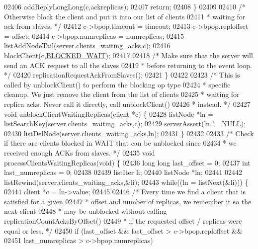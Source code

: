 \begin{DoxyCode}
{{{{{{{{{{{{{{{{{{{{{{{{{{{{{{{{{{{{{{{{{{{{{{{{{{{{{{{{{{{{{{{{{{{{{{{{{{{02406         addReplyLongLong(c,ackreplicas);
02407         \textcolor{keywordflow}{return};
02408     \}
02409 
02410     \textcolor{comment}{/* Otherwise block the client and put it into our list of clients}
02411 \textcolor{comment}{     * waiting for ack from slaves. */}
02412     c->bpop.timeout = timeout;
02413     c->bpop.reploffset = offset;
02414     c->bpop.numreplicas = numreplicas;
02415     listAddNodeTail(server.clients\_waiting\_acks,c);
02416     blockClient(c,\hyperlink{server_8h_accb912da92773eadb0b938af3fa95c63}{BLOCKED\_WAIT});
02417 
02418     \textcolor{comment}{/* Make sure that the server will send an ACK request to all the slaves}
02419 \textcolor{comment}{     * before returning to the event loop. */}
02420     replicationRequestAckFromSlaves();
02421 \}
02422 
02423 \textcolor{comment}{/* This is called by unblockClient() to perform the blocking op type}
02424 \textcolor{comment}{ * specific cleanup. We just remove the client from the list of clients}
02425 \textcolor{comment}{ * waiting for replica acks. Never call it directly, call unblockClient()}
02426 \textcolor{comment}{ * instead. */}
02427 \textcolor{keywordtype}{void} unblockClientWaitingReplicas(client *c) \{
02428     listNode *ln = listSearchKey(server.clients\_waiting\_acks,c);
02429     \hyperlink{server_8h_a88114b5169b4c382df6b56506285e56a}{serverAssert}(ln != NULL);
02430     listDelNode(server.clients\_waiting\_acks,ln);
02431 \}
02432 
02433 \textcolor{comment}{/* Check if there are clients blocked in WAIT that can be unblocked since}
02434 \textcolor{comment}{ * we received enough ACKs from slaves. */}
02435 \textcolor{keywordtype}{void} processClientsWaitingReplicas(\textcolor{keywordtype}{void}) \{
02436     \textcolor{keywordtype}{long} \textcolor{keywordtype}{long} last\_offset = 0;
02437     \textcolor{keywordtype}{int} last\_numreplicas = 0;
02438 
02439     listIter li;
02440     listNode *ln;
02441 
02442     listRewind(server.clients\_waiting\_acks,&li);
02443     \textcolor{keywordflow}{while}((ln = listNext(&li))) \{
02444         client *c = ln->value;
02445 
02446         \textcolor{comment}{/* Every time we find a client that is satisfied for a given}
02447 \textcolor{comment}{         * offset and number of replicas, we remember it so the next client}
02448 \textcolor{comment}{         * may be unblocked without calling replicationCountAcksByOffset()}
02449 \textcolor{comment}{         * if the requested offset / replicas were equal or less. */}
02450         \textcolor{keywordflow}{if} (last\_offset && last\_offset > c->bpop.reploffset &&
02451                            last\_numreplicas > c->bpop.numreplicas)
}}}}}}}}}}}}}}}}}}}}}}}}}}}}}}}}}}}}}}}}}}}}}}}}}}}}}}}}}}}}}}}}}}}}}}}}}}}
\end{DoxyCode}
